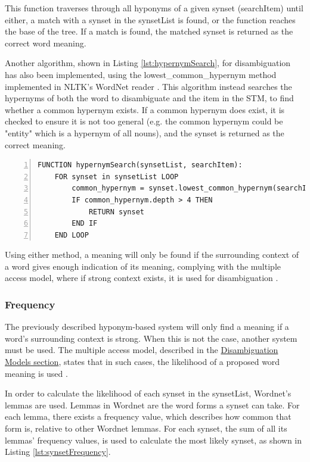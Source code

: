 \documentclass[]{article}
\begin{document}
This function traverses through all hyponyms of a given synset (searchItem) until either, a match with a synset in the synsetList is found, or the function reaches the base of the tree. If a match is found, the matched synset is returned as the correct word meaning.

Another algorithm, shown in Listing \ref{lst:hypernymSearch}, for disambiguation has also been implemented, using the lowest{\_}common{\_}hypernym method implemented in NLTK's WordNet reader \cite{NLTK}. This algorithm instead searches the hypernyms of both the word to disambiguate and the item in the STM, to find whether a common hypernym exists. If a common hypernym does exist, it is checked to ensure it is not too general (e.g. the common hypernym could be "entity" which is a hypernym of all nouns), and the synset is returned as the correct meaning.

\begin{lstlisting}[numbers=left, numberstyle=\small, caption={THE HYPERNYMSEARCH FUNCTION}, captionpos=b, label={lst:hypernymSearch}]
FUNCTION hypernymSearch(synsetList, searchItem):
    FOR synset in synsetList LOOP
        common_hypernym = synset.lowest_common_hypernym(searchItem)
        IF common_hypernym.depth > 4 THEN
            RETURN synset
       	END IF
   	END LOOP
\end{lstlisting}  

Using either method, a meaning will only be found if the surrounding context of a word gives enough indication of its meaning, complying with the multiple access model, where if strong context exists, it is used for disambiguation \cite{PsychologyOfLanguage}.

\subsubsection{Frequency}
\label{sec:DisambiguationFrequency}
The previously described hyponym-based system will only find a meaning if a word's surrounding context is strong. When this is not the case, another system must be used. The multiple access model, described in the \hyperref[sec:DisambiguationModels]{Disambiguation Models section}, states that in such cases, the likelihood of a proposed word meaning is used \cite{PsychologyOfLanguage}.

In order to calculate the likelihood of each synset in the synsetList, Wordnet's lemmas are used. Lemmas in Wordnet are the word forms a synset can take. For each lemma, there exists a frequency value, which describes how common that form is, relative to other Wordnet lemmas. For each synset, the sum of all its lemmas' frequency values, is used to calculate the most likely synset, as shown in Listing \ref{lst:synsetFrequency}.
\end{document}
